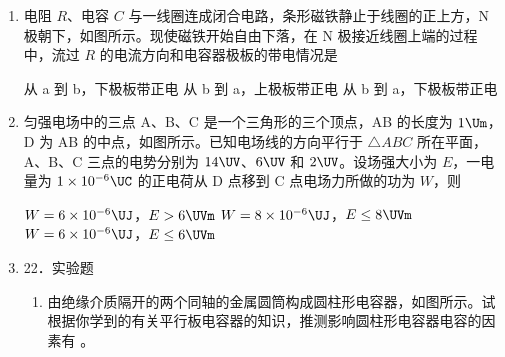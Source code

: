 \documentclass[\gkver]{gaokaozhenti}
\begin{document}
\begin{enumerate}

\item
电阻 $R$、电容 $C$ 与一线圈连成闭合电路，条形磁铁静止于线圈的正上方，N 极朝下，如图所示。现使磁铁开始自由下落，在 N 极接近线圈上端的过程中，流过 $R$ 的电流方向和电容器极板的带电情况是


{从 a 到 b，下极板带正电}
{从 b 到 a，上极板带正电}
{从 b 到 a，下极板带正电}


\item
匀强电场中的三点 A、B、C 是一个三角形的三个顶点，AB 的长度为 $1\Um$，D 为 AB 的中点，如图所示。已知电场线的方向平行于 $\triangle ABC$ 所在平面，A、B、C 三点的电势分别为 $14\UV$、$6\UV$ 和 $2\UV$。设场强大小为 $E$，一电量为 $1\times10^{-6}\UC$ 的正电荷从 D 点移到 C 点电场力所做的功为 $W$，则


{$W=6\times10^{-6}\UJ$，$E>6\UVm$}
{$W=8\times10^{-6}\UJ$，$E\leq8\UVm$}
{$W=6\times10^{-6}\UJ$，$E\leq6\UVm$}


\item
22．实验题

\begin{enumerate}
	\item
	由绝缘介质隔开的两个同轴的金属圆筒构成圆柱形电容器，如图所示。试根据你学到的有关平行板电容器的知识，推测影响圆柱形电容器电容的因素有 。



\end{enumerate}
\end{enumerate}
\end{document}
